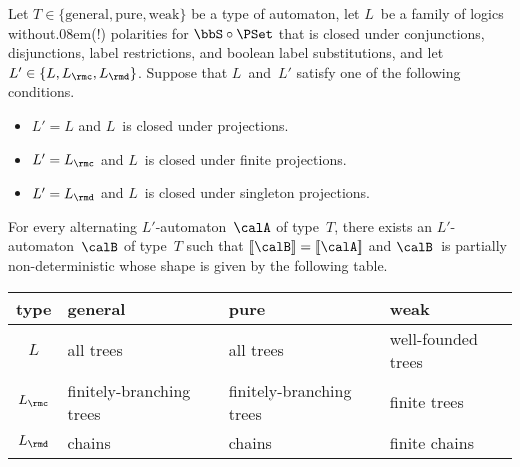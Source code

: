 \documentclass[10pt, fleqn]{scrartcl}
\newcommand*{\?}{\kern .08em}
\newcommand\lsem{[\![}
\newcommand\rsem{]\!]}
\begin{document}
\begin{Prop}\label{Prop: alternating => non-deterministic}
Let $T \in \{\mathrm{general},\mathrm{pure},\mathrm{weak}\}$ be a type of automaton,
let $L$~be a family of logics without\?(!) polarities for $\bbS \circ \PSet$
that is closed under conjunctions, disjunctions, label restrictions, and boolean label
substitutions, and let $L' \in \{L,L_\rmc,L_\rmd\}$.
Suppose that $L$~and~$L'$ satisfy one of the following conditions.
\begin{itemize}
\item $L' = L$ and $L$~is closed under projections.
\item $L' = L_\rmc$ and $L$~is closed under finite projections.
\item $L' = L_\rmd$ and $L$~is closed under singleton projections.
\end{itemize}

For every alternating $L'$-automaton~$\calA$ of type~$T$, there exists an
$L'$-automaton~$\calB$ of type~$T$ such that $\lsem\calB\rsem = \lsem\calA\rsem$ and
$\calB$~is partially non-deterministic whose shape is given by the following table.

\medskip
\noindent\centering
\begin{tabular}{c@{\hskip1.5em}lll}
\toprule
  type     & general                  & pure                     & weak \\
\midrule
  $L$      & all trees                & all trees                & well-founded trees \\
  $L_\rmc$ & finitely-branching trees & finitely-branching trees & finite trees \\
  $L_\rmd$ & chains                   & chains                   & finite chains \\
\bottomrule
\end{tabular}
\end{Prop}
\end{document}
